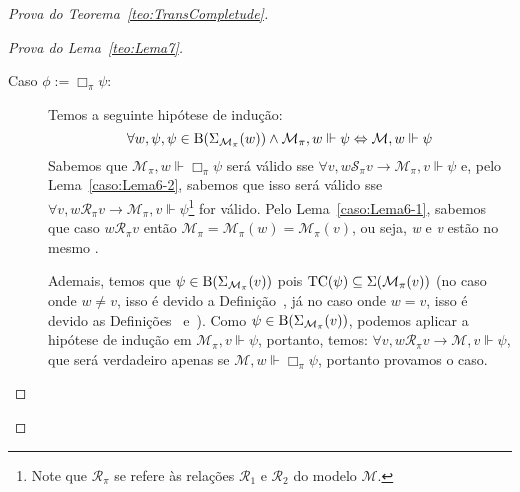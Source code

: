 \begin{apendicesenv}
\begin{proof}[Prova do Teorema~\ref{teo:TransCompletude}]
\begin{proof}[Prova do Lema~\ref{teo:Lema7}]
\begin{description}



                    \item[\textnormal{Caso \(\phi := \Box_{\pi} \psi\):}] Temos a seguinte hipótese de indução:
                    \[
                        \forall w, \psi, \psi \in \operatorname{B}(\Sigma_{\mathcal{M}_{\pi}}(w)) \land \mathcal{M}_{\pi}, w \Vdash \psi \Leftrightarrow \mathcal{M}, w \Vdash \psi
                    \]
                    Sabemos que \(\mathcal{M}_{\pi}, w \Vdash \Box_{\pi} \psi\) será válido sse \(\forall v, w \mathcal{S}_{\pi} v \to \mathcal{M}_{\pi}, v \Vdash \psi\) e,
                    pelo Lema~\ref{caso:Lema6-2}, sabemos que isso será válido sse \(\forall v, w \mathcal{R}_{\pi} v \to \mathcal{M}_{\pi}, v \Vdash \psi\)\footnote{Note que
                    \(\mathcal{R}_{\pi}\) se refere às relações \(\mathcal{R}_{1}\) e \(\mathcal{R}_{2}\) do modelo \(\mathcal{M}\).} for válido.
                    Pelo Lema~\ref{caso:Lema6-1}, sabemos que caso \(w \mathcal{R}_{\pi} v\) então \(\mathcal{M}_{\pi} = \mathcal{M}_{\pi}(w) = \mathcal{M}_{\pi}(v)\), ou seja,
                    \textit{w} e \textit{v} estão no mesmo \PImodelo.

                    Ademais, temos que \(\psi \in \operatorname{B}(\Sigma_{\mathcal{M}_{\pi}}(v))\) pois \(\operatorname{TC}(\psi) \subseteq \Sigma(\mathcal{M}_{\pi}(v))\)
                    (no caso onde \(w \neq v\), isso é devido a Definição~, já no caso onde \(w = v\), isso é devido as
                    Definições~ e~).
                    Como \(\psi \in \operatorname{B}(\Sigma_{\mathcal{M}_{\pi}}(v))\), podemos aplicar a hipótese de indução em \(\mathcal{M}_{\pi}, v \Vdash \psi\), portanto, temos:
                    \(\forall v, w \mathcal{R}_{\pi} v \to \mathcal{M}, v \Vdash \psi\), que será verdadeiro apenas se \(\mathcal{M}, w \Vdash \Box_{\pi} \psi\), portanto
                    provamos o caso.


\end{description}
\end{proof}
\end{proof}
\end{apendicesenv}
